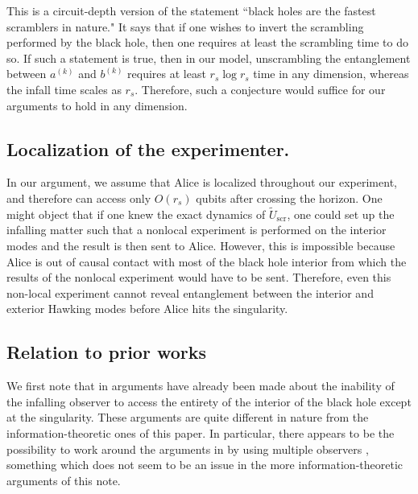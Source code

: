 \documentclass[a4paper,11pt]{article}
\theoremstyle{definition}
\begin{document}
This is a circuit-depth version of the statement ``black holes are the fastest scramblers in nature."
It says that if one wishes to invert the scrambling performed by the black hole, then one requires at least the scrambling time to do so.
If such a statement is true, then in our model, unscrambling the entanglement between $a^{(k)}$ and $b^{(k)}$ requires at least ${r_s}\log {r_s}$ time in any dimension, whereas the infall time scales as ${r_s}$.
Therefore, such a conjecture would suffice for our arguments to hold in any dimension.


\subsection{Localization of the experimenter.} 

In our argument, we assume that Alice is localized throughout our experiment, and therefore can access only $O(r_s)$ qubits after crossing the horizon. One might object that if one knew the exact dynamics of $\tilde{U}_\mathrm{scr}$, one could set up the infalling matter such that a nonlocal experiment is performed on the interior modes and the result is then sent to Alice. However, this is impossible because Alice is out of causal contact with most of the black hole interior \cite{Freivogel} from which the results of the nonlocal experiment would have to be sent. 
Therefore, even this non-local experiment cannot reveal entanglement between the interior and exterior Hawking modes before Alice hits the singularity.


\subsection{Relation to prior works}
\label{sec:priorworks}

We first note that in \cite{Freivogel} arguments have already been made about the inability of the infalling observer to access the entirety of the interior of the black hole except at the singularity. These arguments are quite different in nature from the information-theoretic ones of this paper. In particular, there appears to be the possibility to work around the arguments in \cite{Freivogel} by using multiple observers \cite{RajuCausalPatches}, something which does not seem to be an issue in the more information-theoretic arguments of this note.
\end{document}
